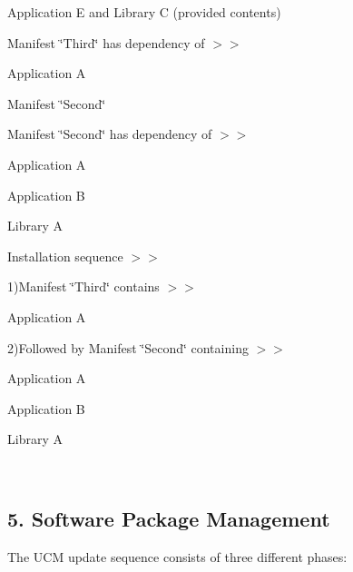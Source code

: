 \begin{longtabu}
\begin{DoxyItemize}
\item Application E and Library C (provided contents)
\item Manifest \char`\"{}\+Third\char`\"{} has dependency of $>$$>$
\begin{DoxyItemize}
\item Application A
\item Manifest \char`\"{}\+Second\char`\"{}
\begin{DoxyItemize}
\item Manifest \char`\"{}\+Second\char`\"{} has dependency of $>$$>$
\begin{DoxyItemize}
\item Application A
\item Application B
\item Library A
\end{DoxyItemize}
\end{DoxyItemize}
\end{DoxyItemize}
\item Installation sequence $>$$>$
\begin{DoxyItemize}
\item 1)Manifest \char`\"{}\+Third\char`\"{} contains $>$$>$
\begin{DoxyItemize}
\item Application A
\end{DoxyItemize}
\item 2)Followed by Manifest \char`\"{}\+Second\char`\"{} containing $>$$>$
\begin{DoxyItemize}
\item Application A
\item Application B
\item Library A   
\end{DoxyItemize}
\end{DoxyItemize}
\end{DoxyItemize}\\
\end{longtabu}


\subsection*{5. Software Package Management}

The U\+CM update sequence consists of three different phases\+:


